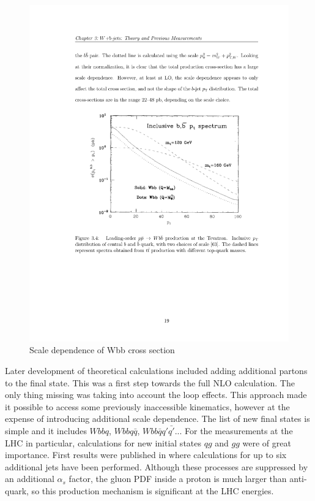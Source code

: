 \begin{figure}[htbp]
	\centering
		\includegraphics{Figures/scale_dep.pdf}
	\caption[Scale dependence of Wbb cross section]{Scale dependence of Wbb cross section}
	\label{fig:scale_dep}
\end{figure}
\par Later development of theoretical calculations included adding additional partons to the final state. This was a first step towards the full NLO calculation. The only thing missing was taking into account the loop effects. This approach made it possible to access some previously inaccessible kinematics, however at the expense of introducing additional scale dependence. The list of new final states is simple and it includes $Wbbq$, $Wbbq\bar{q}$, $Wbb\bar{q}q'\bar{q'}$... For the measurements at the LHC in particular, calculations for new initial states $qg$ and $gg$ were of great importance. First results were published in \cite{Mangano:2001xp} where calculations for up to six additional jets have been performed. Although these processes are suppressed by an additional $\alpha_s$ factor, the gluon PDF inside a proton is much larger than anti-quark, so this production mechanism is significant at the LHC energies. 
